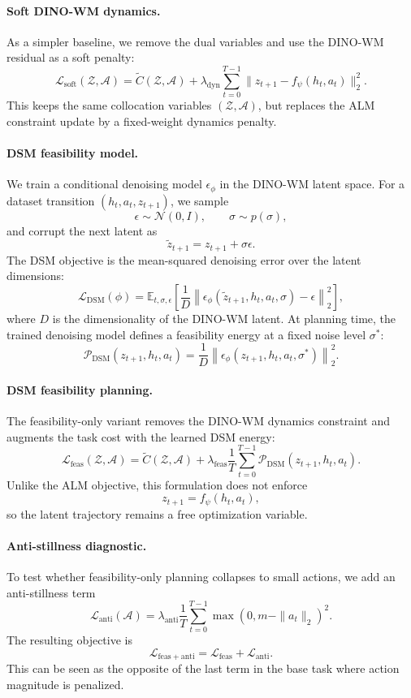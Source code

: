 \paragraph{Soft DINO-WM dynamics.}
As a simpler baseline, we remove the dual variables and use the DINO-WM residual as a soft penalty:
\[
\mathcal{L}_{\mathrm{soft}}(\mathcal{Z},\mathcal{A})
=
\tilde C(\mathcal{Z},\mathcal{A})
+
\lambda_{\mathrm{dyn}}
\sum_{t=0}^{T-1}
\|z_{t+1}-f_\psi(h_t,a_t)\|_2^2 .
\]
This keeps the same collocation variables \((\mathcal{Z},\mathcal{A})\), but replaces the ALM constraint update by a fixed-weight dynamics penalty.

\paragraph{DSM feasibility model.}
We train a conditional denoising model \(\epsilon_\phi\) in the DINO-WM latent space. For a dataset transition \((h_t,a_t,z_{t+1})\), we sample
\[
\epsilon\sim\mathcal{N}(0,I),
\qquad
\sigma\sim p(\sigma),
\]
and corrupt the next latent as
\[
\tilde z_{t+1}=z_{t+1}+\sigma\epsilon.
\]
The DSM objective is the mean-squared denoising error over the latent dimensions:
\[
\mathcal{L}_{\mathrm{DSM}}(\phi)
=
\mathbb{E}_{t,\sigma,\epsilon}
\left[
\frac{1}{D}
\left\|
\epsilon_\phi(\tilde z_{t+1},h_t,a_t,\sigma)-\epsilon
\right\|_2^2
\right],
\]
where \(D\) is the dimensionality of the DINO-WM latent. At planning time, the trained denoising model defines a feasibility energy at a fixed noise level \(\sigma^\ast\):
\[
\mathcal{P}_{\mathrm{DSM}}(z_{t+1},h_t,a_t)
=
\frac{1}{D}
\left\|
\epsilon_\phi(z_{t+1},h_t,a_t,\sigma^\ast)
\right\|_2^2 .
\]

\paragraph{DSM feasibility planning.}
The feasibility-only variant removes the DINO-WM dynamics constraint and augments the task cost with the learned DSM energy:
\[
\mathcal{L}_{\mathrm{feas}}(\mathcal{Z},\mathcal{A})
=
\tilde C(\mathcal{Z},\mathcal{A})
+
\lambda_{\mathrm{feas}}
\frac{1}{T}
\sum_{t=0}^{T-1}
\mathcal{P}_{\mathrm{DSM}}(z_{t+1},h_t,a_t).
\]
Unlike the ALM objective, this formulation does not enforce
\[
z_{t+1}=f_\psi(h_t,a_t),
\]
so the latent trajectory remains a free optimization variable.

\paragraph{Anti-stillness diagnostic.}
To test whether feasibility-only planning collapses to small actions, we add an anti-stillness term
\[
\mathcal{L}_{\mathrm{anti}}(\mathcal{A})
=
\lambda_{\mathrm{anti}}
\frac{1}{T}
\sum_{t=0}^{T-1}
\max(0,m-\|a_t\|_2)^2 .
\]
The resulting objective is
\[
\mathcal{L}_{\mathrm{feas+anti}}
=
\mathcal{L}_{\mathrm{feas}}
+
\mathcal{L}_{\mathrm{anti}}.
\]
This can be seen as the opposite of the last term in the base task where action magnitude is penalized. 
